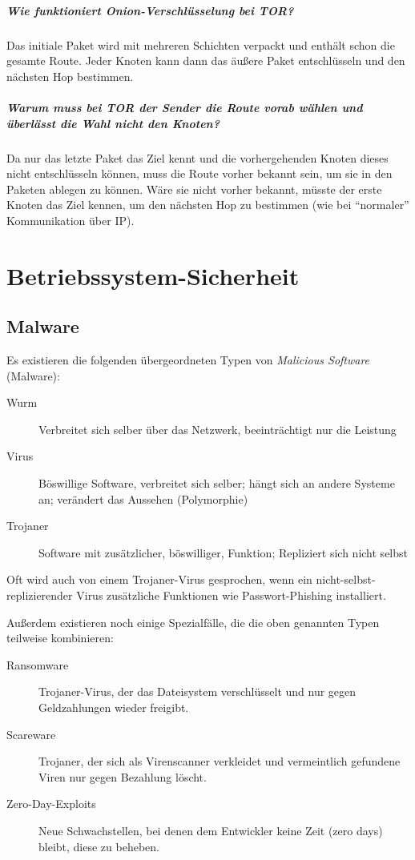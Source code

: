 \paragraph{Wie funktioniert Onion-Verschlüsselung bei TOR?}
	Das initiale Paket wird mit mehreren Schichten verpackt und enthält schon die gesamte Route. Jeder Knoten kann dann das äußere Paket entschlüsseln und den nächsten Hop bestimmen.

	\paragraph{Warum muss bei TOR der Sender die Route vorab wählen und überlässt die Wahl nicht den Knoten?}
		Da nur das letzte Paket das Ziel kennt und die vorhergehenden Knoten dieses nicht entschlüsseln können, muss die Route vorher bekannt sein, um sie in den Paketen ablegen zu können. Wäre sie nicht vorher bekannt, müsste der erste Knoten das Ziel kennen, um den nächsten Hop zu bestimmen (wie bei \enquote{normaler} Kommunikation über IP).

\chapter{Betriebssystem-Sicherheit}
\section{Malware}
	Es existieren die folgenden übergeordneten Typen von \textit{Malicious Software} (Malware):
	\begin{description}
		\item[Wurm] Verbreitet sich selber über das Netzwerk, beeinträchtigt nur die Leistung
		\item[Virus] Böswillige Software, verbreitet sich selber; hängt sich an andere Systeme an; verändert das Aussehen (Polymorphie)
		\item[Trojaner] Software mit zusätzlicher, böswilliger, Funktion; Repliziert sich nicht selbst
	\end{description}
	Oft wird auch von einem Trojaner-Virus gesprochen, wenn ein nicht-selbst-replizierender Virus zusätzliche Funktionen wie Passwort-Phishing installiert.

	Außerdem existieren noch einige Spezialfälle, die die oben genannten Typen teilweise kombinieren:
	\begin{description}
		\item[Ransomware] Trojaner-Virus, der das Dateisystem verschlüsselt und nur gegen Geldzahlungen wieder freigibt.
		\item[Scareware] Trojaner, der sich als Virenscanner verkleidet und vermeintlich gefundene Viren nur gegen Bezahlung löscht.
		\item[Zero-Day-Exploits] Neue Schwachstellen, bei denen dem Entwickler keine Zeit (zero days) bleibt, diese zu beheben.
	\end{description}

